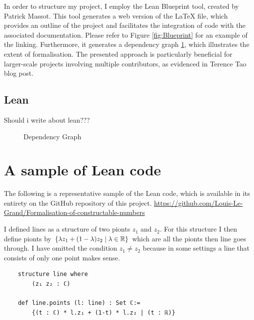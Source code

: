 In order to structure my project, I employ the Lean Blueprint tool, created by Patrick Massot. \cite{Massot_2020}
This tool generates a web version of the LaTeX file, which provides an outline of the project and facilitates the integration of code with the associated documentation. 
Please refer to Figure \ref{fig:Blueprint} for an example of the linking. 
Furthermore, it generates a dependency graph \ref{fig:DependencyGraph}, which illustrates the extent of formalisation.
The presented approach is particularly beneficial for larger-scale projects involving multiple contributors, as evidenced in Terence Tao blog post. \cite{Tao_2023}



\subsection*{Lean}
Should i write about lean???
\clearpage
\begin{figure}[h]
    \centering
    \label{fig:DependencyGraph}
    \caption{Dependency Graph}
\end{figure}
\clearpage
\section{A sample of Lean code} 
The following is a representative sample of the Lean code, which is available in its entirety on the GitHub repository of this project. 
\url{https://github.com/Louis-Le-Grand/Formalisation-of-constructable-numbers}

I defined lines as a structure of two pionts $z_1$ and $z_2$. 
For this structure I then define pionts by $\{\lambda z_1 + (1-\lambda)z_2\mid\lambda\in\mathbb{R}\}$ which are all the pionts then line goes through. 
I have omitted the condition $z_1\ne z_2$ because in some settings a line that consists of only one point makes sense.
\begin{lstlisting}
    structure line where
        (z₁ z₂ : ℂ)

    def line.points (l: line) : Set ℂ:= 
        {(t : ℂ) * l.z₁ + (1-t) * l.z₂ | (t : ℝ)}
\end{lstlisting}

